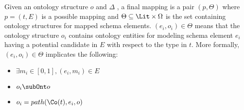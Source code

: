     
    \begin{definition}\label{def:finalMapping}
    	Given an ontology structure $o$ and \simpleSchema $\Delta$ , a final mapping is a pair $(p,\Theta)$ where $p=(t,E)$ is a possible mapping and $\Theta\subseteq\Lit\times\Omega$ is the set containing ontology structures for mapped schema elements. $(e_i,o_i)\in\Theta$ means that the ontology structure $o_i$ contains ontology entities for modeling schema element $e_i$ having a potential candidate in $E$ with respect to the type in $t$. More formally, $(e_i,o_i)\in\Theta$ implicates the following:
    	\begin{itemize}
    		\item $\exists m_i\in[0,1], (e_i,m_i)\in E$
    		\item $o_i \subOnt o$
    		\item $o_i = path(\Co(t),e_i,o)$
    	\end{itemize}
    	
    	
    	
    \end{definition} 
